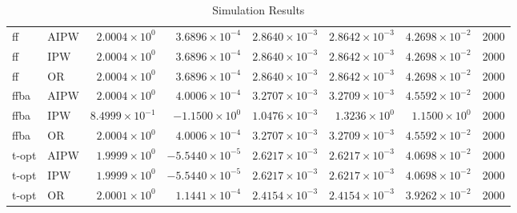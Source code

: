 \begin{table}[ht]
\begin{tabular}{llrrrrrr}
   \midrule
ff & AIPW & $2.0004 \times 10^{0}$ & $3.6896 \times 10^{-4}$ & $2.8640 \times 10^{-3}$ & $2.8642 \times 10^{-3}$ & $4.2698 \times 10^{-2}$ & 2000 \\ 
  ff & IPW & $2.0004 \times 10^{0}$ & $3.6896 \times 10^{-4}$ & $2.8640 \times 10^{-3}$ & $2.8642 \times 10^{-3}$ & $4.2698 \times 10^{-2}$ & 2000 \\ 
  ff & OR & $2.0004 \times 10^{0}$ & $3.6896 \times 10^{-4}$ & $2.8640 \times 10^{-3}$ & $2.8642 \times 10^{-3}$ & $4.2698 \times 10^{-2}$ & 2000 \\ 
   \midrule
ffba & AIPW & $2.0004 \times 10^{0}$ & $4.0006 \times 10^{-4}$ & $3.2707 \times 10^{-3}$ & $3.2709 \times 10^{-3}$ & $4.5592 \times 10^{-2}$ & 2000 \\ 
  ffba & IPW & $8.4999 \times 10^{-1}$ & $-1.1500 \times 10^{0}$ & $1.0476 \times 10^{-3}$ & $1.3236 \times 10^{0}$ & $1.1500 \times 10^{0}$ & 2000 \\ 
  ffba & OR & $2.0004 \times 10^{0}$ & $4.0006 \times 10^{-4}$ & $3.2707 \times 10^{-3}$ & $3.2709 \times 10^{-3}$ & $4.5592 \times 10^{-2}$ & 2000 \\ 
   \midrule
t-opt & AIPW & $1.9999 \times 10^{0}$ & $-5.5440 \times 10^{-5}$ & $2.6217 \times 10^{-3}$ & $2.6217 \times 10^{-3}$ & $4.0698 \times 10^{-2}$ & 2000 \\ 
  t-opt & IPW & $1.9999 \times 10^{0}$ & $-5.5440 \times 10^{-5}$ & $2.6217 \times 10^{-3}$ & $2.6217 \times 10^{-3}$ & $4.0698 \times 10^{-2}$ & 2000 \\ 
  t-opt & OR & $2.0001 \times 10^{0}$ & $1.1441 \times 10^{-4}$ & $2.4154 \times 10^{-3}$ & $2.4154 \times 10^{-3}$ & $3.9262 \times 10^{-2}$ & 2000 \\ 
   \bottomrule
\end{tabular}
\caption{Simulation Results} 
\label{tab:results}
\end{table}